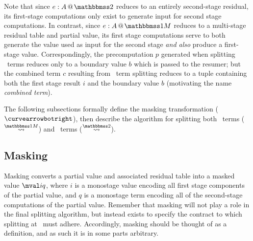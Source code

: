 \begin{abstrsyn}
Note that since $\coltwo e A$ reduces to an entirely second-stage
residual, its first-stage computations only exist to generate input
for second stage computations.  In contrast, since $\colmix e A$
reduces to a multi-stage residual table and partial value, its first
stage computations serve to both generate the value used as input for
the second stage {\em and also} produce a first-stage value.
Correspondingly, the precomputation $p$ generated when splitting
\bbtwo\ terms reduces only to a boundary value $b$ which is passed to
the resumer; but the combined term $c$ resulting from \bbonem\ term
splitting reduces to a tuple containing both the first stage result
$i$ and the boundary value $b$ (motivating the name {\em combined
term}).

The following subsections formally define the masking transformation
($\vsplito$), then describe the algorithm for splitting both
\bbonem\ terms ($\splitonesym$) and \bbtwo\ terms ($\splittwosym$).
  
\subsection{Masking}

Masking converts a partial value and associated residual table into a
masked value $\mval i q$, where $i$ is a monostage value encoding all
first stage components of the partial value, and $q$ is a monostage
term encoding all of the second-stage computations of the partial
value.  Remember that masking will not play a role in the final
splitting algorithm, but instead exists to specify the contract to
which splitting at \bbonem\ must adhere.  Accordingly, masking should
be thought of as a definition, and as such it is in some parts
arbitrary.


\end{abstrsyn}
